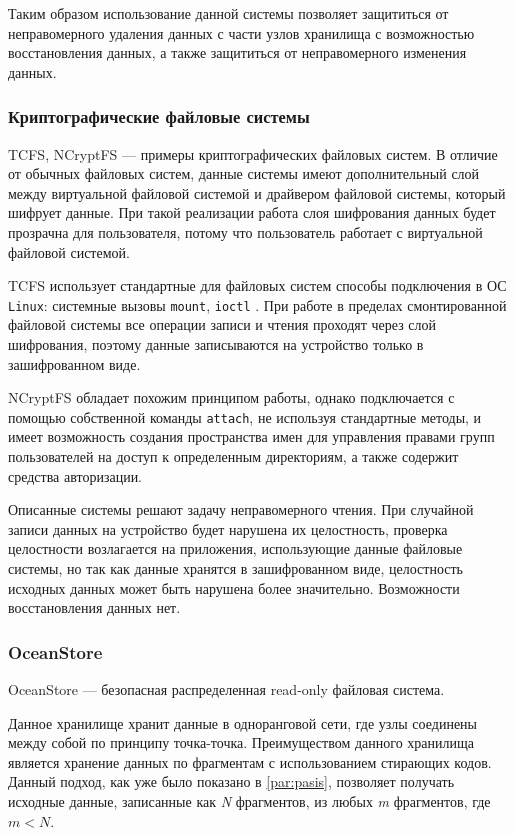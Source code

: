 Таким образом использование данной системы позволяет защититься от неправомерного удаления данных с части узлов хранилища с возможностью восстановления данных, а также защититься от неправомерного изменения данных.

\subsubsection{Криптографические файловые системы}

TCFS\cite{tcfs}, NCryptFS\cite{ncryptfs} --- примеры криптографических файловых систем. В отличие от обычных файловых систем, данные системы имеют дополнительный слой между виртуальной файловой системой и драйвером файловой системы, который шифрует данные. При такой реализации работа слоя шифрования данных будет прозрачна для пользователя, потому что пользователь работает с виртуальной файловой системой.

TCFS использует стандартные для файловых систем способы подключения в ОС \texttt{Linux}: системные вызовы \texttt{mount}, \texttt{ioctl} \cite{linux}. При работе в пределах смонтированной файловой системы все операции записи и чтения проходят через слой шифрования, поэтому данные записываются на устройство только в зашифрованном виде.

NCryptFS обладает похожим принципом работы, однако подключается с помощью собственной команды \texttt{attach}, не используя стандартные методы, и имеет возможность создания пространства имен для управления правами групп пользователей на доступ к определенным директориям, а также содержит средства авторизации.

Описанные системы решают задачу неправомерного чтения. При случайной записи данных на устройство будет нарушена их целостность, проверка целостности возлагается на приложения, использующие данные файловые системы, но так как данные хранятся в зашифрованном виде, целостность исходных данных может быть нарушена более значительно. Возможности восстановления данных нет.

\subsubsection{OceanStore}
\label{par:ocean}

OceanStore\cite{ocean} --- безопасная распределенная read-only файловая система.

Данное хранилище хранит данные в одноранговой сети, где узлы соединены между собой по принципу точка-точка. Преимуществом данного хранилища является хранение данных по фрагментам с использованием стирающих кодов. Данный подход, как уже было показано в \ref{par:pasis}, позволяет получать исходные данные, записанные как \textit{N} фрагментов, из любых \textit{m} фрагментов, где $m < N$.

